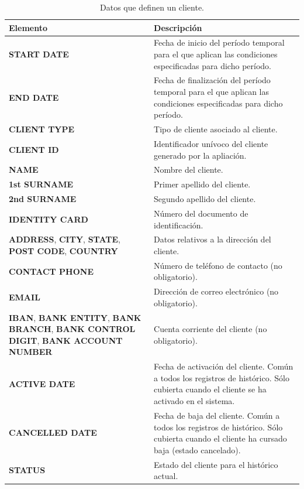 \begin{table}[H]
  \centering
  \setlength{\leftmargini}{0.4cm}
  \resizebox{14cm}{!} {
  \begin{tabular}{|m{6cm} m{8cm}|}
  \rowcolor{udcpink!25}
  \hline
  	\textbf{Elemento} & \textbf{Descripción} \\\hline
  	\textbf{START DATE} & Fecha de inicio del período temporal para el que aplican las condiciones especificadas para dicho período.\\
  	\textbf{END DATE} & Fecha de finalización del período temporal para el que aplican las condiciones especificadas para dicho período.\\
	\textbf{CLIENT TYPE} & Tipo de cliente asociado al cliente.\\
	\textbf{CLIENT ID} & Identificador unívoco del cliente generado por la apliación.\\
	\textbf{NAME} & Nombre del cliente.\\
	\textbf{1st SURNAME} & Primer apellido del cliente.\\
	\textbf{2nd SURNAME} & Segundo apellido del cliente.\\
	\textbf{IDENTITY CARD} & Número del documento de identificación.\\	
	\textbf{ADDRESS}, \textbf{CITY}, \textbf{STATE}, \textbf{POST CODE}, \textbf{COUNTRY}  & Datos relativos a la dirección del cliente.\\	
	\textbf{CONTACT PHONE} & Número de teléfono de contacto (no obligatorio).\\
	\textbf{EMAIL} & Dirección de correo electrónico (no obligatorio).\\
	\textbf{IBAN}, \textbf{BANK ENTITY}, \textbf{BANK BRANCH}, \textbf{BANK CONTROL DIGIT}, \textbf{BANK ACCOUNT NUMBER} & Cuenta corriente del cliente (no obligatorio).\\
	\textbf{ACTIVE DATE} & Fecha de activación del cliente. Común a todos los registros de histórico. Sólo cubierta cuando el cliente se ha activado en el sistema.\\
	\textbf{CANCELLED DATE} & Fecha de baja del cliente. Común a todos los registros de histórico. Sólo cubierta cuando el cliente ha cursado baja (estado cancelado).\\	
	\textbf{STATUS} & Estado del cliente para el histórico actual.	
	\\\hline
  \end{tabular}
  } %
  \caption{Datos que definen un cliente.}
  \label{tab:cliente}
\end{table}



